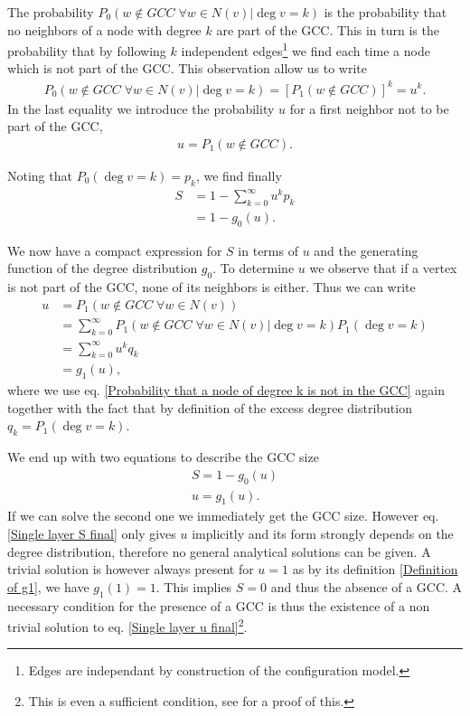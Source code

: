 \documentclass[
11pt, %
english, %
singlespacing, %
nolistspacing, %
liststotoc, %
headsepline, %
]{MastersDoctoralThesis} %
\begin{document}
The probability $P_0(w \notin GCC\; \forall w \in N(v)|\deg{v} = k)$ is the probability that no neighbors of a node with degree $k$ are part of the GCC. This in turn is the probability that by following $k$ independent edges\footnote{Edges are independant by construction of the configuration model.} we find each time a node which is not part of the GCC. This observation allow us to write
\begin{align}
	P_0(w \notin GCC\; \forall w \in N(v)|\deg{v} = k) = \left[P_1(w \notin GCC)\right]^k = u^k. \label{Probability that a node of degree k is not in the GCC}
\end{align}
In the last equality we introduce the probability $u$ for a first neighbor not to be part of the GCC,
\begin{align}
	u = P_1(w \notin GCC). \label{Definition of u}
\end{align}

Noting that $P_0(\deg{v} = k) = p_k$, we find finally
\begin{align}
	S	&= 1 - \sum_{k=0}^\infty u^k p_k \\
		&= 1 - g_0(u).
\end{align}

We now have a compact expression for $S$ in terms of $u$ and the generating function of the degree distribution $g_0$. To determine $u$ we observe that if a vertex is not part of the GCC, none of its neighbors is either. Thus we can write
\begin{align}
	u 	&= P_1(w \notin GCC \; \forall w \in N(v)) \\
		&= \sum_{k=0}^\infty P_1(w \notin GCC \; \forall w \in N(v)| \deg{v} = k) P_1(\deg{v} = k) \\
		&= \sum_{k=0}^\infty u^k q_k \\
		&= g_1(u),
\end{align}
where we use eq. \eqref{Probability that a node of degree k is not in the GCC} again together with the fact that by definition of the excess degree distribution $q_k = P_1(\deg{v} = k)$.

We end up with two equations to describe the GCC size
\begin{align}
	S = 1 - g_0(u) \label{Single layer S final} \\
	u = g_1(u). \label{Single layer u final}
\end{align}
If we can solve the second one we immediately get the GCC size. However eq. \eqref{Single layer S final} only gives $u$ implicitly and its form strongly depends on the degree distribution, therefore no general analytical solutions can be given. A trivial solution is however always present for $u = 1$ as by its definition \eqref{Definition of g1}, we have $g_1(1) = 1$. This implies $S = 0$ and thus the absence of a GCC. A necessary condition for the presence of a GCC is thus the existence of a non trivial solution to eq. \eqref{Single layer u final}\footnote{This is even a sufficient condition, see \citep{newman2010networks} for a proof of this.}.
\end{document}
